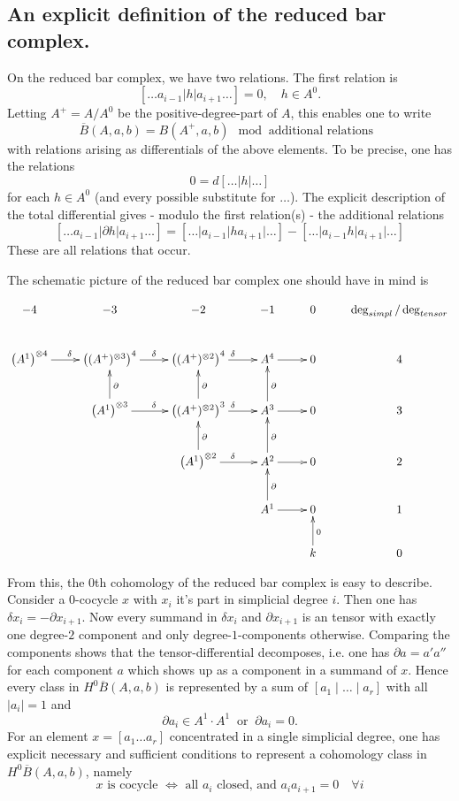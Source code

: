 \subsection{An explicit definition of the reduced bar complex.}
On the reduced bar complex, we have two relations. The first relation is 
\[ [ \ldots a_{i-1} | h | a_{i+1} \ldots ] = 0 , \quad  h \in A^0. \] 
Letting $A^+ = A/A^0$ be the positive-degree-part of $A$, this enables one to write
\[ 
      \overline B(A,a,b) = B(A^+, a,b) \mod \text{ additional relations }
\]
with relations arising as differentials of the above elements. 
To be precise, one has the relations
\[
   0 = d[\ldots |h|\ldots ] 
\]
for each $h \in A^0$ (and every possible substitute for $\ldots$).
The explicit description of the total differential gives - modulo the first relation(s) - the additional relations 
\[
     [\ldots a_{i-1} | \partial h | a_{i+1}  \ldots ]
     = [\ldots|a_{i-1}|h a_{i+1}|\ldots] 
     - [\ldots|a_{i-1}h|a_{i+1}|\ldots]
\]
These are all relations that occur.

The schematic picture of the reduced bar complex one should have in mind is


\[
\begin{xy}
\xymatrix{
  {-4} & {-3} & {-2} & {-1} & {0} & {\deg_{simpl} / \deg_{tensor}} \\ 
  \left( A^1 \right)^{\otimes 4} \ar[r]^\delta & \left((A^+)^{\otimes 3} \right)^4 \ar[r]^\delta & \left( (A^+)^{\otimes 2} \right)^4 \ar[r]^\delta &  A^4  \ar[r] &  0  & 4 \\ 
   &   \left(A^1 \right)^{\otimes 3} \ar[r]^\delta \ar[u]_{\partial} & \left((A^+)^{\otimes 2} \right)^3 \ar[r]^\delta \ar[u]_\partial & A^3 \ar[r] \ar[u]_\partial & 0 & 3 \\
   &   & {\left(A^1 \right)^{\otimes 2} \ar[r]^\delta \ar[u]_\partial } & {A^2 \ar[r]} \ar[u]_\partial & {0} & {2} \\
   &   &   & {A^1 \ar[r] \ar[u]_\partial} & {0} & {1} \\
   &   &   &   & k \ar[u]_0  & {0} 
}\end{xy} 
\]

From this, the $0$th cohomology of the reduced bar complex is easy to describe. 
Consider a 0-cocycle $x$ with $x_i$ it's part in simplicial degree $i$. Then one has $\delta x_i = -\partial x_{i+1}$.
Now every summand in $\delta x_i$ and $\partial x_{i+1}$ is an tensor with exactly one degree-$2$ component and only degree-$1$-components otherwise. 
Comparing the components shows that the tensor-differential decomposes, i.e. one has $\partial a = a' a''$ for each component $a$ which shows up as a component in a summand of $x$. 
Hence every class in $H^0 \overline{B}(A, a, b)$ is represented by a sum of $[a_1 \mid \ldots \mid a_r]$ with all $|a_i| = 1$ and 
\[
     \partial a_i \in A^1 \cdot A^1  \ \text{ or } \ \partial a_i = 0.
\]
For an element $x = [a_1 \ldots a_r] $ concentrated in a single simplicial degree, one has explicit necessary and sufficient conditions to represent a cohomology class in $H^0 \overline B(A,a,b)$, namely 
\[ 
  x \text{ is cocycle } \iff \text{ all } a_i \text{ closed, and } a_i a_{i+1} = 0 \quad \forall i 
\]


